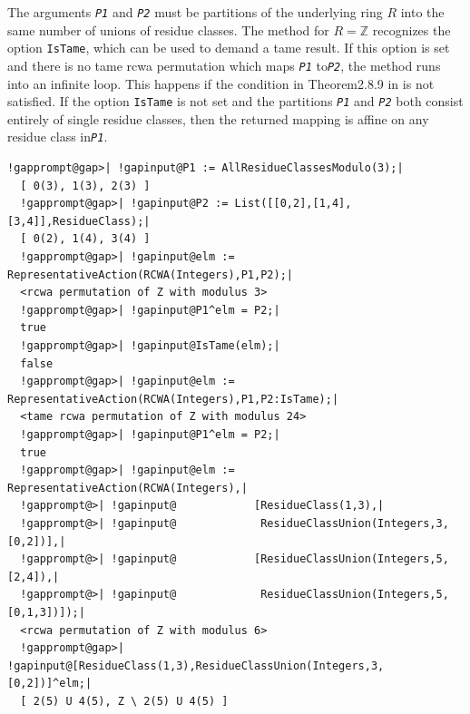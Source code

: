 \documentclass[a4paper,11pt]{report}
\begin{document}
{{{ The arguments \mbox{\texttt{\mdseries\slshape P1}} and \mbox{\texttt{\mdseries\slshape P2}} must be partitions of the underlying ring $R$ into the same number of unions of residue classes. The method for $R = {\ensuremath{\mathbb Z}}$ recognizes the option \texttt{IsTame}, which can be used to demand a tame result. If this option is set and there
is no tame rcwa permutation which maps \mbox{\texttt{\mdseries\slshape P1}} to{\nobreakspace}\mbox{\texttt{\mdseries\slshape P2}}, the method runs into an infinite loop. This happens if the condition in
Theorem{\nobreakspace}2.8.9 in{\nobreakspace}\cite{Kohl05} is not satisfied. If the option \texttt{IsTame} is not set and the partitions \mbox{\texttt{\mdseries\slshape P1}} and \mbox{\texttt{\mdseries\slshape P2}} both consist entirely of single residue classes, then the returned mapping is
affine on any residue class in{\nobreakspace}\mbox{\texttt{\mdseries\slshape P1}}. 
\begin{Verbatim}[commandchars=!@|,fontsize=\small,frame=single,label=Example]
  !gapprompt@gap>| !gapinput@P1 := AllResidueClassesModulo(3);|
  [ 0(3), 1(3), 2(3) ]
  !gapprompt@gap>| !gapinput@P2 := List([[0,2],[1,4],[3,4]],ResidueClass);|
  [ 0(2), 1(4), 3(4) ]
  !gapprompt@gap>| !gapinput@elm := RepresentativeAction(RCWA(Integers),P1,P2);|
  <rcwa permutation of Z with modulus 3>
  !gapprompt@gap>| !gapinput@P1^elm = P2;|
  true
  !gapprompt@gap>| !gapinput@IsTame(elm);|
  false
  !gapprompt@gap>| !gapinput@elm := RepresentativeAction(RCWA(Integers),P1,P2:IsTame);|
  <tame rcwa permutation of Z with modulus 24>
  !gapprompt@gap>| !gapinput@P1^elm = P2;|
  true
  !gapprompt@gap>| !gapinput@elm := RepresentativeAction(RCWA(Integers),|
  !gapprompt@>| !gapinput@            [ResidueClass(1,3),|
  !gapprompt@>| !gapinput@             ResidueClassUnion(Integers,3,[0,2])],|
  !gapprompt@>| !gapinput@            [ResidueClassUnion(Integers,5,[2,4]),|
  !gapprompt@>| !gapinput@             ResidueClassUnion(Integers,5,[0,1,3])]);|
  <rcwa permutation of Z with modulus 6>
  !gapprompt@gap>| !gapinput@[ResidueClass(1,3),ResidueClassUnion(Integers,3,[0,2])]^elm;|
  [ 2(5) U 4(5), Z \ 2(5) U 4(5) ]
\end{Verbatim}
 }

 

}}
\end{document}
